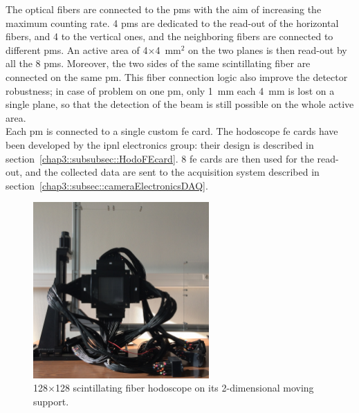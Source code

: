 The optical fibers are connected to the \glspl{pm} with the aim of increasing the maximum counting rate. 4 \glspl{pm} are dedicated to the read-out of the horizontal fibers, and 4 to the vertical ones, and the neighboring fibers are connected to different \glspl{pm}. An active area of 4$\times$4~mm$^{2}$ on the two planes is then read-out by all the 8 \glspl{pm}. Moreover, the two sides of the same scintillating fiber are connected on the same \gls{pm}. This fiber connection logic also improve the detector robustness; in case of problem on one \gls{pm}, only 1~mm each 4~mm is lost on a single plane, so that the detection of the beam is still possible on the whole active area.\\  
Each \gls{pm} is connected to a single custom \gls{fe} card. The hodoscope \gls{fe} cards have been developed by the \gls{ipnl} electronics group: their design is described in section~\ref{chap3::subsubsec::HodoFEcard}. 8 \gls{fe} cards are then used for the read-out, and the collected data are sent to the acquisition system described in section~\ref{chap3::subsec::cameraElectronicsDAQ}.

\begin{figure}[!htbp]
\centering
\includegraphics[width=0.6\textwidth]{03_GraphicFiles/chapter3_CLaRySproto/Hodoscope/Hodoscope_onTable.jpg}
\caption{128$\times$128 scintillating fiber hodoscope on its 2-dimensional moving support.}
\label{chap3::fig::HodoscopeMain}
\end{figure}

